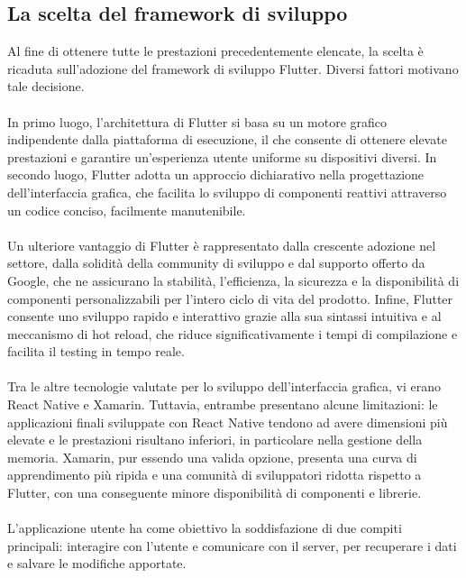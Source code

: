 \subsection{La scelta del framework di sviluppo}
Al fine di ottenere tutte le prestazioni precedentemente elencate, 
la scelta è ricaduta sull’adozione del framework di sviluppo Flutter.
Diversi fattori motivano tale decisione. \\
\\
In primo luogo, l'architettura di Flutter si basa su un motore grafico indipendente dalla piattaforma di esecuzione,
il che consente di ottenere elevate prestazioni e 
garantire un'esperienza utente uniforme su dispositivi diversi.
In secondo luogo, Flutter adotta un approccio dichiarativo nella progettazione dell'interfaccia grafica,
che facilita lo sviluppo di componenti reattivi attraverso un codice conciso, facilmente manutenibile.\\
\\
Un ulteriore vantaggio di Flutter è rappresentato dalla crescente adozione nel settore,
dalla solidità della community di sviluppo e dal supporto offerto da Google,
che ne assicurano la stabilità, l'efficienza, la sicurezza e la disponibilità 
di componenti personalizzabili per l'intero ciclo di vita del prodotto.
Infine, Flutter consente uno sviluppo rapido e interattivo grazie alla sua sintassi intuitiva e al meccanismo di hot reload,
che riduce significativamente i tempi di compilazione e facilita il testing in tempo reale.\\
\\
Tra le altre tecnologie valutate per lo sviluppo dell'interfaccia grafica, vi erano React Native e Xamarin.
Tuttavia, entrambe presentano alcune limitazioni: 
le applicazioni finali sviluppate con React Native tendono ad avere dimensioni più elevate e le prestazioni risultano inferiori,
in particolare nella gestione della memoria.
Xamarin, pur essendo una valida opzione, presenta una curva di apprendimento più ripida e 
una comunità di sviluppatori ridotta rispetto a Flutter,
con una conseguente minore disponibilità di componenti e librerie.\\
\\
L'applicazione utente ha come obiettivo la soddisfazione di due compiti principali: interagire con l'utente e 
comunicare con il server, per recuperare i dati e salvare le modifiche apportate.

\clearpage


